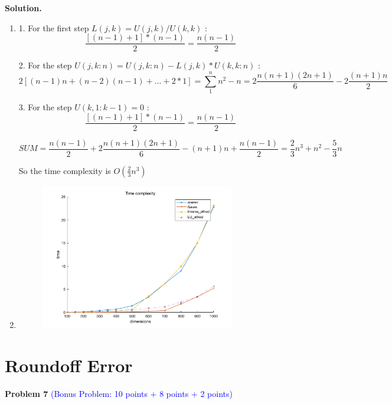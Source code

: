 \documentclass[english,onecolumn]{IEEEtran}
\begin{document}
\noindent\textbf{Solution.}
\begin{enumerate}
    \item 
    
    1. For the first step $L(j,k)=U(j,k)/U(k,k)$ :
    $$\frac{[  (n-1)  + 1]  * (n-1)  }  {2  }    = \frac{n (n-1) }{ 2}$$
    
    2. For the  step $U(j,k:n)=U(j,k:n)-L(j,k)*U(k,k:n)$ :
    $$2[ (n-1)n + (n-2)(n-1)+...+2*1 ]   = \sum_1^n n^2 -n = 2 \frac{n(n+1)(2n+1)}{6}-2 \frac{(n+1)n}{2}$$
    
    3. For the  step $U(k,1:k-1)=0$ :
    $$\frac{[  (n-1)  + 1]  * (n-1)  }  {2  }    = \frac{n (n-1) }{ 2}$$
    
    $$SUM = \frac{n (n-1) }{ 2} + 2 \frac{n(n+1)(2n+1)}{6}-(n+1)n+ \frac{n (n-1) }{ 2} = \frac{2}{3}n^3+n^2-\frac{5}{3}n$$
    
    So the time complexity is $O(\frac{2}{3} n^3)$
    
    \item
    
    	\begin{figure}[h]
    	\centering
    	\includegraphics[width=0.8\textwidth]{Time_complexity.png}
  
    \end{figure}
    \begin{enumerate}
    
    \end{enumerate}
\end{enumerate}

\newpage

\section{Roundoff Error}
\noindent\textbf{Problem 7} \textcolor{blue}{(Bonus Problem: 10 points + 8 points + 2 points)}
\end{document}
